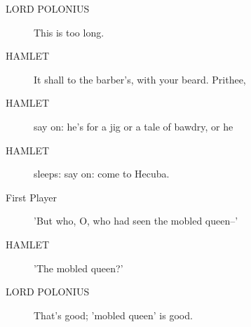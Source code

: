 \documentclass{article}
\begin{document}
\begin{description}
            
\item[LORD POLONIUS] This is too long.
\end{description}
          
\begin{description}
            
\item[HAMLET] It shall to the barber's, with your beard. Prithee,
\item[HAMLET] say on: he's for a jig or a tale of bawdry, or he
\item[HAMLET] sleeps: say on: come to Hecuba.
\end{description}
          
\begin{description}
            
\item[First Player] 'But who, O, who had seen the mobled queen--'
\end{description}
          
\begin{description}
            
\item[HAMLET] 'The mobled queen?'
\end{description}
          
\begin{description}
            
\item[LORD POLONIUS] That's good; 'mobled queen' is good.
\end{description}
          
\end{document}
